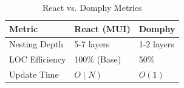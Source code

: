 \begin{table}[h]
\centering
\caption{React vs. Domphy Metrics}
\begin{tabular}{lll}
\toprule
Metric & React (MUI) & Domphy \\ \midrule
Nesting Depth & 5-7 layers & 1-2 layers \\
LOC Efficiency & 100\% (Base) & 50\% \\
Update Time & $O(N)$ & $O(1)$ \\ \bottomrule
\end{tabular}
\end{table}